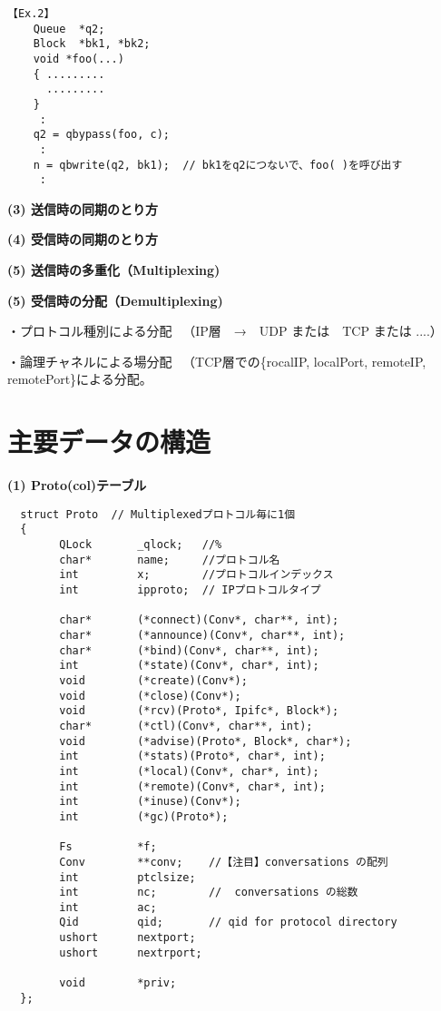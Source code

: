 {\small
\begin{verbatim}
【Ex.2】
    Queue  *q2;
    Block  *bk1, *bk2;
    void *foo(...)
    { .........  
      .........
    }
     :
    q2 = qbypass(foo, c);
     :
    n = qbwrite(q2, bk1);  // bk1をq2につないで、foo( )を呼び出す
     :
\end{verbatim}
}



{\bf \flushleft(3) 送信時の同期のとり方}


\vspace{4cm}

{\bf \flushleft(4) 受信時の同期のとり方}

\vspace{4cm}

{\bf \flushleft(5) 送信時の多重化（Multiplexing)}

\vspace{4cm}


{\bf \flushleft(5) 受信時の分配（Demultiplexing)}

・プロトコル種別による分配
　（IP層　→　UDP または　TCP または ....）


・論理チャネルによる場分配
　（TCP層での\{rocalIP, localPort, remoteIP, remotePort\}による分配。

\vspace{4cm}




\section{主要データの構造}

{\bf \flushleft(1) Proto(col)テーブル}

{\footnotesize
\begin{verbatim}
  struct Proto  // Multiplexedプロトコル毎に1個
  {
        QLock       _qlock;   //%
        char*       name;     //プロトコル名
        int         x;        //プロトコルインデックス
        int         ipproto;  // IPプロトコルタイプ

        char*       (*connect)(Conv*, char**, int);
        char*       (*announce)(Conv*, char**, int);
        char*       (*bind)(Conv*, char**, int);
        int         (*state)(Conv*, char*, int);
        void        (*create)(Conv*);
        void        (*close)(Conv*);
        void        (*rcv)(Proto*, Ipifc*, Block*);
        char*       (*ctl)(Conv*, char**, int);
        void        (*advise)(Proto*, Block*, char*);
        int         (*stats)(Proto*, char*, int);
        int         (*local)(Conv*, char*, int);
        int         (*remote)(Conv*, char*, int);
        int         (*inuse)(Conv*);
        int         (*gc)(Proto*); 

        Fs          *f;        
        Conv        **conv;    //【注目】conversations の配列
        int         ptclsize;  
        int         nc;        //  conversations の総数
        int         ac;
        Qid         qid;       // qid for protocol directory 
        ushort      nextport;
        ushort      nextrport;

        void        *priv;
  };
\end{verbatim}
}

